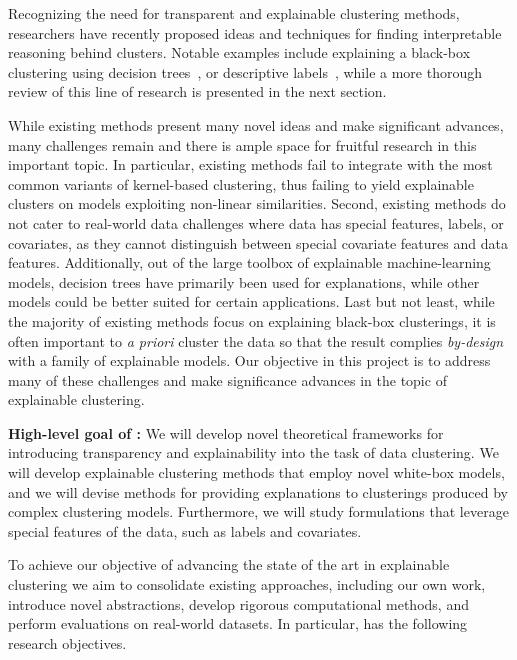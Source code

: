 \documentclass[a4paper,11pt]{article}
\begin{document}
Recognizing the need for transparent and explainable clustering methods, 
researchers have recently proposed ideas and techniques for finding 
interpretable reasoning behind clusters.
Notable examples include 
explaining a black-box clustering using decision trees~\cite{gupta2023price,moshkovitz2020explainable},
or descriptive labels~\cite{davidson2018cluster,sambaturu2020efficient}, 
while a more thorough review of this line of research is presented in the next section.

While existing methods present many novel ideas and make significant advances, 
many challenges remain and there is ample space for fruitful research in this important topic. 
In particular, existing methods fail to integrate with the most common variants of kernel-based clustering, 
thus failing to yield explainable clusters on models exploiting non-linear similarities.
Second, existing methods do not cater to real-world data challenges where data has special features, 
labels, or covariates, as they cannot distinguish between special covariate features and data features.
Additionally, out of the large toolbox of explainable machine-learning models,
decision trees have primarily been used for explanations, 
while other models could be better suited for certain applications. 
Last but not least, while the majority of existing methods focus on explaining black-box clusterings, 
it is often important to \emph{a priori} cluster the data so that the result complies 
\emph{by-design} with a family of explainable models.
Our objective in this project is to address many of these challenges
and make significance advances in the topic of explainable clustering.

\medskip
\noindent
\hspace{-3mm}\colorbox{verylightmagenta}{
\begin{minipage}{\textwidth}
{\bf High-level goal of \acronym:} 
We will develop novel theoretical frameworks for 
introducing transparency and explainability into the task of data clustering. 
We will develop explainable clustering methods that employ novel white-box models, 
and we will devise methods for providing explanations to clusterings produced by complex clustering models.
Furthermore, we will study formulations that leverage special features of the data,
such as labels and covariates.
\end{minipage}}

To achieve our objective of advancing the state of the art in explainable clustering
we aim to consolidate existing approaches,  including our own work,  
introduce novel abstractions, 
develop rigorous computational methods, and 
perform evaluations on real-world datasets.
In particular, {\acronym} has the following research objectives. 
\end{document}
